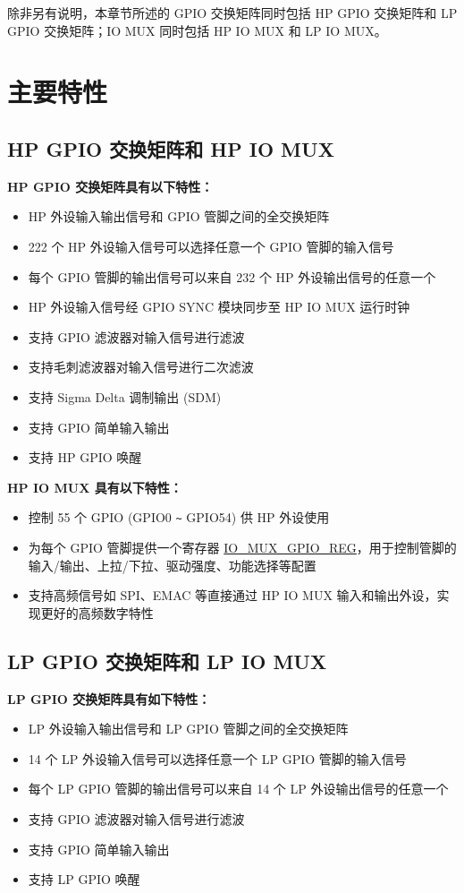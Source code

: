 \documentclass[main\_\_CN.tex]{subfiles}
\begin{document}
除非另有说明，本章节所述的 GPIO 交换矩阵同时包括 HP GPIO 交换矩阵和 LP GPIO 交换矩阵；IO MUX 同时包括 HP IO MUX 和 LP IO MUX。

\section{主要特性}
\subsection{HP GPIO 交换矩阵和 HP IO MUX}
\textbf{HP GPIO 交换矩阵具有以下特性：}
\begin{itemize}
\item HP 外设输入输出信号和 GPIO 管脚之间的全交换矩阵
\item 222 个 HP 外设输入信号可以选择任意一个 GPIO 管脚的输入信号
\item 每个 GPIO 管脚的输出信号可以来自 232 个 HP 外设输出信号的任意一个
\item HP 外设输入信号经 GPIO SYNC 模块同步至 HP IO MUX 运行时钟
\item 支持 GPIO 滤波器对输入信号进行滤波
\item 支持毛刺滤波器对输入信号进行二次滤波
\item 支持 Sigma Delta 调制输出 (SDM)
\item 支持 GPIO 简单输入输出
\item 支持 HP GPIO 唤醒
\end{itemize}

\textbf{HP IO MUX 具有以下特性：}
\begin{itemize}
\item 控制 55 个 GPIO (GPIO0 \verb+~+ GPIO54) 供 HP 外设使用
\item 为每个 GPIO 管脚提供一个寄存器 \hyperref[regdesc:IOMUXGPIONREG]{IO\_MUX\_GPIO\_REG}，用于控制管脚的输入/输出、上拉/下拉、驱动强度、功能选择等配置
\item 支持高频信号如 SPI、EMAC 等直接通过 HP IO MUX 输入和输出外设，实现更好的高频数字特性
\end{itemize}

\subsection{LP GPIO 交换矩阵和 LP IO MUX}

\textbf{LP GPIO 交换矩阵具有如下特性：}
\begin{itemize}
\item LP 外设输入输出信号和 LP GPIO 管脚之间的全交换矩阵
\item 14 个 LP 外设输入信号可以选择任意一个 LP GPIO 管脚的输入信号
\item 每个 LP GPIO 管脚的输出信号可以来自 14 个 LP 外设输出信号的任意一个
\item 支持 GPIO 滤波器对输入信号进行滤波
\item 支持 GPIO 简单输入输出
\item 支持 LP GPIO 唤醒
\end{itemize}
\end{document}
